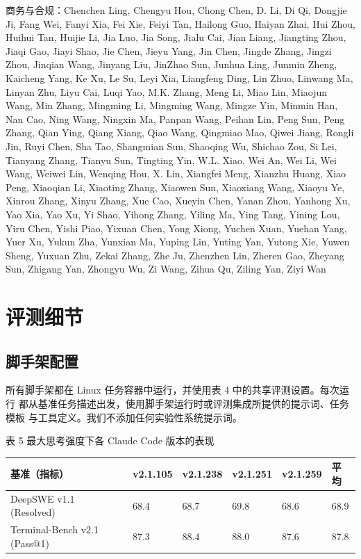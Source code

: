 \documentclass[
  10
]{article}
\newcounter{none} %
\begin{document}
商务与合规：Chenchen Ling, Chengyu Hou, Chong Chen, D. Li,
Di Qi, Dongjie Ji, Fang Wei, Fanyi Xia, Fei Xie, Feiyi Tan, Hailong Guo,
Haiyan Zhai, Hui Zhou, Huihui Tan, Huijie Li, Jia Luo, Jia Song, Jialu
Cai, Jian Liang, Jiangting Zhou, Jiaqi Gao, Jiayi Shao, Jie Chen, Jieyu
Yang, Jin Chen, Jingde Zhang, Jingzi Zhou, Jinqian Wang, Jinyang Liu,
JinZhao Sun, Junhua Ling, Junmin Zheng, Kaicheng Yang, Ke Xu, Le Su,
Leyi Xia, Liangfeng Ding, Lin Zhuo, Linwang Ma, Linyan Zhu, Liyu Cai,
Luqi Yao, M.K. Zhang, Meng Li, Miao Lin, Miaojun Wang, Min Zhang,
Mingming Li, Mingming Wang, Mingze Yin, Minmin Han, Nan Cao, Ning Wang,
Ningxin Ma, Panpan Wang, Peihan Lin, Peng Sun, Peng Zhang, Qian Ying,
Qiang Xiang, Qiao Wang, Qingmiao Mao, Qiwei Jiang, Rongli Jin, Ruyi
Chen, Sha Tao, Shangmian Sun, Shaoqing Wu, Shichao Zou, Si Lei, Tianyang
Zhang, Tianyu Sun, Tingting Yin, W.L. Xiao, Wei An, Wei Li, Wei Wang,
Weiwei Lin, Wenqing Hou, X. Lin, Xiangfei Meng, Xianzhu Huang, Xiao
Peng, Xiaoqian Li, Xiaoting Zhang, Xiaowen Sun, Xiaoxiang Wang, Xiaoyu
Ye, Xinrou Zhang, Xinyu Zhang, Xue Cao, Xueyin Chen, Yanan Zhou, Yanhong
Xu, Yao Xia, Yao Xu, Yi Shao, Yihong Zhang, Yiling Ma, Ying Tang, Yining
Lou, Yiru Chen, Yishi Piao, Yixuan Chen, Yong Xiong, Yuchen Xuan, Yuehan
Yang, Yuer Xu, Yukun Zha, Yunxian Ma, Yuping Lin, Yuting Yan, Yutong
Xie, Yuwen Sheng, Yuxuan Zhu, Zekai Zhang, Zhe Ju, Zhenzhen Lin, Zheren
Gao, Zheyang Sun, Zhigang Yan, Zhongyu Wu, Zi Wang, Zihua Qu, Ziling
Yan, Ziyi Wan

\section{评测细节}\label{b.-evaluation-details}

\subsection{脚手架配置}\label{b.1.-scaffold-configurations}

所有脚手架都在 Linux 任务容器中运行，并使用表 4 中的共享评测设置。每次运行
都从基准任务描述出发，使用脚手架运行时或评测集成所提供的提示词、任务模板
与工具定义。我们不添加任何实验性系统提示词。



表 5 \textbar{} 最大思考强度下各 Claude Code 版本的表现

{\footnotesize{} %
\begin{longtable}[]{@{}|L{15.0em}|l|l|l|l|l|@{}}
\toprule\noalign{}
\endhead
\bottomrule\noalign{}
\endlastfoot
\hline
基准（指标） & v2.1.105 & v2.1.238 & v2.1.251 & v2.1.259 & 平均 \\
\hline
DeepSWE v1.1 (Resolved) & 68.4 & 68.7 & 69.8 & 68.6 & 68.9 \\
\hline
Terminal-Bench v2.1 (Pass@1) & 87.3 & 88.4 & 88.0 & 87.6 & 87.8 \\
\hline
\end{longtable}
}
\end{document}
